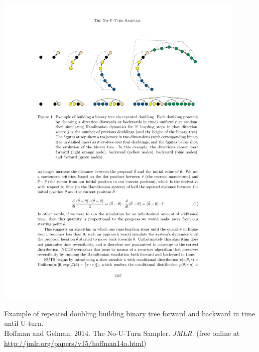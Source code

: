 \documentclass[10pt]{report}
\begin{document}
\vspace*{-6pt}
\begin{center}
\includegraphics[width=0.9\textwidth]{img/NUTS-tree-evolution.pdf}
\end{center}
\begin{subitemize}
\item Example of repeated doubling building binary tree forward and
  backward in time until U-turn.  
\\[3pt]
\footnotesize
Hoffman and Gelman. 2014. The No-U-Turn Sampler. {\slshape JMLR}.
(free online at \url{http://jmlr.org/papers/v15/hoffman14a.html})
\end{subitemize}
\end{document}
